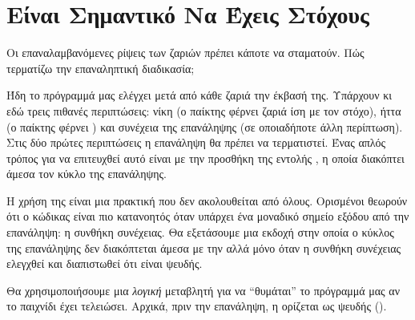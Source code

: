 \documentclass[a4paper,11pt,oneside]{book}
\begin{document}

\section{Είναι Σημαντικό Να Έχεις Στόχους}

\begin{question}
Οι επαναλαμβανόμενες ρίψεις των ζαριών πρέπει κάποτε να σταματούν. Πώς τερματίζω την επαναληπτική διαδικασία;
\end{question}

Ήδη το πρόγραμμά μας ελέγχει μετά από κάθε ζαριά την έκβασή της. Υπάρχουν κι εδώ τρεις πιθανές περιπτώσεις: νίκη (ο παίκτης φέρνει ζαριά ίση με τον στόχο), ήττα (ο παίκτης φέρνει ) και συνέχεια της επανάληψης (σε οποιαδήποτε άλλη περίπτωση). Στις δύο πρώτες περιπτώσεις η επανάληψη θα πρέπει να τερματιστεί. Ένας απλός τρόπος για να επιτευχθεί αυτό είναι με την προσθήκη της εντολής , η οποία διακόπτει άμεσα τον κύκλο της επανάληψης.


Η χρήση της  είναι μια πρακτική που δεν ακολουθείται από όλους. Ορισμένοι θεωρούν ότι ο κώδικας είναι πιο κατανοητός όταν υπάρχει ένα μοναδικό σημείο εξόδου από την επανάληψη: η συνθήκη συνέχειας. Θα εξετάσουμε μια εκδοχή στην οποία ο κύκλος της επανάληψης δεν διακόπτεται άμεσα με την  αλλά μόνο όταν η συνθήκη συνέχειας ελεγχθεί και διαπιστωθεί ότι είναι ψευδής.


Θα χρησιμοποιήσουμε μια \emph{λογική} %
μεταβλητή  για να ``θυμάται'' το πρόγραμμά μας αν το παιχνίδι έχει τελειώσει. Αρχικά, πριν την επανάληψη, η  ορίζεται ως ψευδής ().
\end{document}
